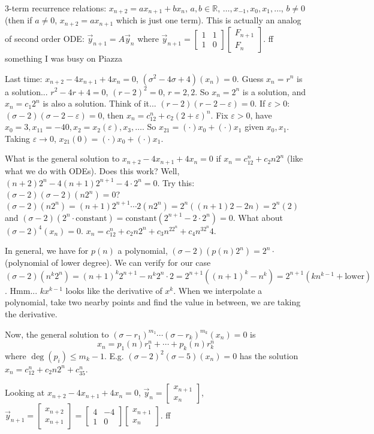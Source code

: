 \documentclass{article}
\theoremstyle{plain}
\theoremstyle{remark}
\newcommand{\R}{{\mathbb R}}
\newcommand{\ep}{{\varepsilon}}
\begin{document}
3-term recurrence relations:
$x_{n+2} = ax_{n+1} + bx_n$, $a,b \in \R$, $\dots, x_{-1},x_0,x_1,\dots$,
$b \neq 0$ (then if $a \neq 0$, $x_{n+2} = ax_{n+1}$ which is just one term).
This is actually an analog of second order ODE:
$\vec{y}_{n+1} = A \vec{y}_n$
where $\vec{y}_{n+1} = \begin{bmatrix} 1 & 1 \\ 1 & 0\end{bmatrix} \begin{bmatrix} F_{n+1} \\ F_n \end{bmatrix}$.
ff something I was busy on Piazza

Last time: $x_{n+2} - 4x_{n+1} + 4x_n = 0$,
$(\sigma^2 - 4\sigma + 4)(x_n) = 0$.
Guess $x_n = r^n$ is a solution...
$r^2 - 4r + 4 = 0$,
$(r-2)^2 = 0$, $r = 2,2$.
So $x_n = 2^n$ is a solution, and $x_n = c_1 2^n$ is also a solution.
Think of it... $(r-2)(r-2-\ep) = 0$.
If $\ep > 0$: $(\sigma - 2)(\sigma - 2 - \ep) = 0$,
then $x_n = c_12^n + c_2(2+\ep)^n$.
Fix $\ep > 0$, have $x_0 = 3, x_11 = -40, x_2 = x_2(\ep), x_3, \dots$.
So $x_{21} = ( \cdot) x_0 + (\cdot) x_1$ given $x_0,x_1$.
Taking $\ep \to 0$, $x_{21}(0) = (\cdot)x_0 + (\cdot)x_1$.

What is the general solution to $x_{n+2} - 4x_{n+1} + 4x_n = 0$
if $x_n = c_12^n + c_2 n 2^n$ (like what we do with ODEs).
Does this work?
Well, $(n+2)2^n - 4(n+1)2^{n+1} - 4\cdot2^n = 0$.
Try this: $(\sigma - 2)(\sigma - 2)(n2^n) = 0$?
$(\sigma - 2)(n2^n) = (n+1)2^{n+1} \cdots 2(n2^n) = 2^n((n+1)2 - 2n) = 2^n (2)$
and $(\sigma - 2)(2^n\cdot \text{constant}) =
\text{constant}(2^{n+1} - 2\cdot 2^n) = 0$.
What about $(\sigma - 2)^4(x_n) = 0$.
$x_n = c_12^n + c_2 n2^n + c_3n^22^n + c_4 n^32^n4$.

In general, we have for $p(n)$ a polynomial,
$(\sigma - 2)(p(n)2^n) = 2^n\cdot$(polynomial of lower degree).
We can verify for our case $(\sigma - 2)(n^k 2^n)
= (n+1)^k2^{n+1} - n^k2^n\cdot 2
= 2^{n+1}((n+1)^k - n^k) = 2^{n+1}(kn^{k-1} + \text{lower})$.
Hmm... $kx^{k-1}$ looks like the derivative of $x^k$.
When we interpolate a polynomial, take two nearby points and find the value in between,
we are taking the derivative.

Now, the general solution to
$(\sigma - r_1)^{m_1}\cdots(\sigma - r_k)^{m_k}(x_n) = 0$ is
\[
	x_n = p_1(n)r_1^n + \cdots + p_k(n)r_k^n
\]
where $\deg(p_i) \leq m_k -1$.
E.g. $(\sigma-2)^2(\sigma - 5)(x_n) = 0$ has the solution
$x_n = c_12^n + c_2n2^n + c_35^n$.

Looking at $x_{n+2} - 4x_{n+1} + 4x_n = 0$,
$\vec{y}_n = \begin{bmatrix} x_{n+1} \\ x_n \end{bmatrix}$,
$\vec{y}_{n+1} = \begin{bmatrix} x_{n+2} \\ x_{n+1} \end{bmatrix} = 
\begin{bmatrix} 4 & -4 \\ 1 & 0 \end{bmatrix}\begin{bmatrix} x_{n+1} \\ x_n \end{bmatrix}$.
ff
\end{document}
